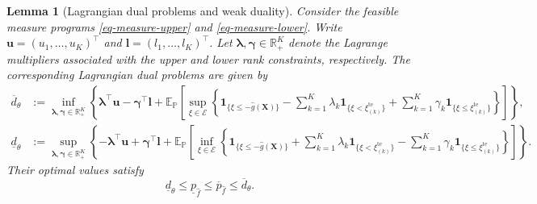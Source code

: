 \documentclass[review,11pt,3p,authoryear,nopreprintline]{elsarticle}
\newtheorem{lemma}{Lemma}
\begin{document}
\begin{lemma}[Lagrangian dual problems and weak duality]
  \label{lem-weak-duality}
  Consider the feasible measure programs \eqref{eq-measure-upper} and \eqref{eq-measure-lower}. Write $\bm u=(u_1,\ldots,u_K)^\top$ and $\bm l=(l_1,\ldots,l_K)^\top$. Let $\bm\lambda,\bm\gamma\in\mathbb R_+^K$ denote the Lagrange multipliers associated with the upper and lower rank constraints, respectively. The corresponding Lagrangian dual problems are given by
  \begin{align}
    \overline d_\theta
    &:=\inf_{\bm\lambda,\bm\gamma\in\mathbb R_+^K}
    \left\{\bm\lambda^\top\bm u-\bm\gamma^\top\bm l
    +\mathbb E_{\mathbb P}\left[\sup_{\xi\in\mathcal E}\left\{
    \mathbf1_{\{\xi\le-\hat g(\bm X)\}}
    -\sum_{k=1}^K\lambda_k\mathbf1_{\{\xi<\xi_{(k)}^{\mathrm{te}}\}}
    +\sum_{k=1}^K\gamma_k\mathbf1_{\{\xi\le\xi_{(k)}^{\mathrm{te}}\}}
    \right\}\right]\right\},
    \label{eq-upper-measure-dual}\\
    \underline d_\theta
    &:=\sup_{\bm\lambda,\bm\gamma\in\mathbb R_+^K}
    \left\{-\bm\lambda^\top\bm u+\bm\gamma^\top\bm l
    +\mathbb E_{\mathbb P}\left[\inf_{\xi\in\mathcal E}\left\{
    \mathbf1_{\{\xi\le-\hat g(\bm X)\}}
    +\sum_{k=1}^K\lambda_k\mathbf1_{\{\xi<\xi_{(k)}^{\mathrm{te}}\}}
    -\sum_{k=1}^K\gamma_k\mathbf1_{\{\xi\le\xi_{(k)}^{\mathrm{te}}\}}
    \right\}\right]\right\}.
    \label{eq-lower-measure-dual}
  \end{align}
  Their optimal values satisfy
  \begin{equation}
    \underline d_\theta\le\underline p_{\hat f}
    \le\overline p_{\hat f}\le\overline d_\theta.
    \label{eq-weak-duality}
  \end{equation}
\end{lemma}
\end{document}
